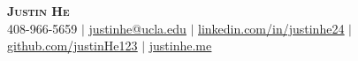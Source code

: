 
\begin{center}
    \textbf{\Huge \scshape Justin He} \\ \vspace{1pt}
    \small 408-966-5659 $|$ \href{mailto:justinhe@ucla.edu}{\underline{justinhe@ucla.edu}} $|$ 
    \href{https://linkedin.com/in/justinhe24}{\underline{linkedin.com/in/justinhe24}} $|$
    \href{https://github.com/justinHe123}{\underline{github.com/justinHe123}} $|$
    \href{https://justinhe.me}{\underline{justinhe.me}}
\end{center}